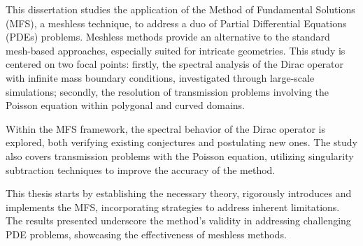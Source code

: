 \acresetall
\noindent
This dissertation studies the application of the Method of Fundamental Solutions (MFS), a meshless technique, to address a duo of Partial Differential Equations (PDEs) problems. Meshless methods provide an alternative to the standard mesh-based approaches, especially suited for intricate geometries. This study is centered on two focal points: firstly, the spectral analysis of the Dirac operator with infinite mass boundary conditions, investigated through large-scale simulations; secondly, the resolution of transmission problems involving the Poisson equation within polygonal and curved domains.

Within the MFS framework, the spectral behavior of the Dirac operator is explored, both verifying existing conjectures and postulating new ones. The study also covers transmission problems with the Poisson equation, utilizing singularity subtraction techniques to improve the accuracy of the method.

This thesis starts by establishing the necessary theory, rigorously introduces and implements the MFS, incorporating strategies to address inherent limitations. The results presented underscore the method's validity in addressing challenging PDE problems, showcasing the effectiveness of meshless methods.